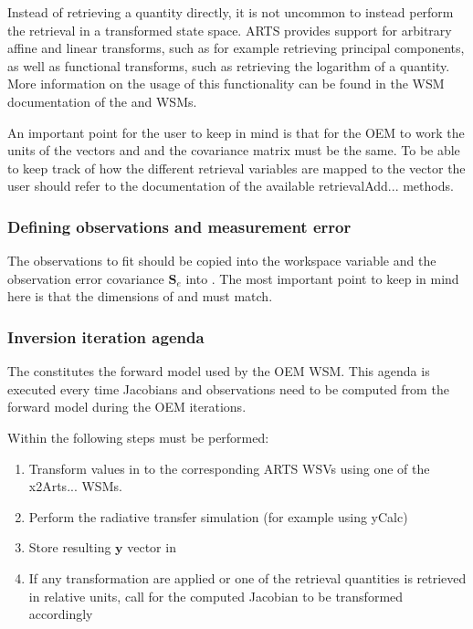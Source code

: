 Instead of retrieving a quantity directly, it is not uncommon
to instead perform the retrieval in a transformed state space. ARTS
provides support for arbitrary affine and linear transforms, such
as for example retrieving principal components, as well as functional
transforms, such as retrieving the logarithm of a quantity. More
information on the usage of this functionality can be found in the
WSM documentation of the 
and  WSMs.

An important point for the user to keep in mind is that for the OEM to
work the units of the vectors  and  and
 the covariance matrix  must be the same. To be
able to keep track of how the different retrieval variables are mapped
to the  vector the user should refer to the
documentation of the available retrievalAdd... methods.

\subsubsection{Defining observations and measurement error}

The observations to fit should be copied into the  workspace
variable and the observation error covariance $\mathbf{S}_e$ into .
The most important point to keep in mind here is that the dimensions of
  and  must match.

\subsubsection{Inversion iteration agenda}

The  constitutes the forward model used by
the OEM WSM. This agenda is executed every time Jacobians and observations need
to be computed from the forward model during the OEM iterations.

Within   the following steps must be
performed:

\begin{enumerate}
\item Transform values in  to the corresponding
ARTS WSVs using one of the x2Arts... WSMs.
\item Perform the radiative transfer simulation (for example using
yCalc)
\item  Store resulting $\mathbf{y}$ vector in 
\item If any transformation are applied or one of the retrieval quantities
is retrieved in relative units, call
  for the computed Jacobian
to be transformed accordingly
\end{enumerate}

